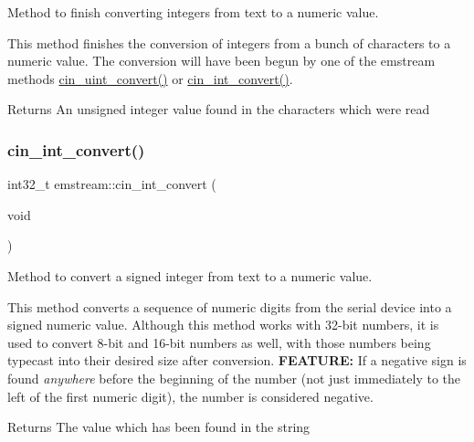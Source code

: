 Method to finish converting integers from text to a numeric value. 

This method finishes the conversion of integers from a bunch of characters to a numeric value. The conversion will have been begun by one of the {\ttfamily emstream} methods {\ttfamily \mbox{\hyperlink{classemstream_a38b9f36ce6ccd5acf98acb8523568d46}{cin\+\_\+uint\+\_\+convert()}}} or {\ttfamily \mbox{\hyperlink{classemstream_ab2c0624ac11a6da71db92d94b6da32aa}{cin\+\_\+int\+\_\+convert()}}}. \begin{DoxyReturn}{Returns}
An unsigned integer value found in the characters which were read 
\end{DoxyReturn}
\mbox{\label{classemstream_ab2c0624ac11a6da71db92d94b6da32aa}} 
\subsubsection{\texorpdfstring{cin\+\_\+int\+\_\+convert()}{cin\_int\_convert()}}
{\footnotesize\ttfamily int32\+\_\+t emstream\+::cin\+\_\+int\+\_\+convert (\begin{DoxyParamCaption}\item[{void}]{ }\end{DoxyParamCaption})\hspace{0.3cm}{\ttfamily [protected]}}



Method to convert a signed integer from text to a numeric value. 

This method converts a sequence of numeric digits from the serial device into a signed numeric value. Although this method works with 32-\/bit numbers, it is used to convert 8-\/bit and 16-\/bit numbers as well, with those numbers being typecast into their desired size after conversion. {\bfseries F\+E\+A\+T\+U\+RE\+:} If a negative sign is found {\itshape anywhere} before the beginning of the number (not just immediately to the left of the first numeric digit), the number is considered negative. \begin{DoxyReturn}{Returns}
The value which has been found in the string 
\end{DoxyReturn}
\mbox{\label{classemstream_a38b9f36ce6ccd5acf98acb8523568d46}} 
